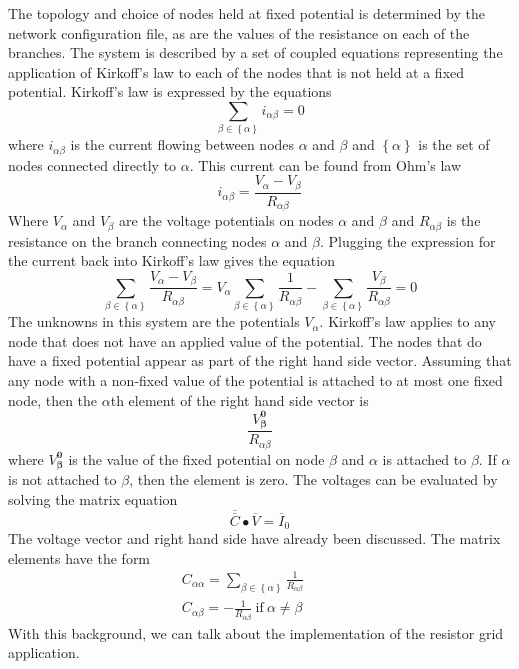 \documentclass[12pt]{report} %
\begin{document}

The topology and choice of nodes held at fixed potential is determined by the network configuration file, as are the values of the resistance on each of the branches. The system is described by a set of coupled equations representing the application of Kirkoff's law to each of the nodes that is not held at a fixed potential. Kirkoff's law is expressed by the equations\[\sum_{\beta \in \left\{\alpha \right\}}{i_{\alpha \beta }=0}\] 
where $i_{\alpha \beta }$ is the current flowing between nodes $\alpha $ and $\beta $ and $\left\{\alpha \right\}$ is the set of nodes connected directly to $\alpha $. This current can be found from Ohm's law
\[i_{\alpha \beta }=\frac{V_{\alpha }-V_{\beta }}{R_{\alpha \beta }}\] 
Where $V_{\alpha }$ and $V_{\beta }$ are the voltage potentials on nodes $\alpha $ and $\beta $ and $R_{\alpha \beta }$ is the resistance on the branch connecting nodes $\alpha $ and $\beta $. Plugging the expression for the current back into Kirkoff's law gives the equation
\[\sum_{\beta \in \left\{\alpha \right\}}{\frac{V_{\alpha }-V_{\beta }}{R_{\alpha \beta }}=V_{\alpha }\sum_{\beta \in \left\{\alpha \right\}}{\frac{1}{R_{\alpha \beta }}}-\sum_{\beta \in \left\{\alpha \right\}}{\frac{V_{\beta }}{R_{\alpha \beta }}}=0}\] 
The unknowns in this system are the potentials $V_{\alpha }$. Kirkoff's law applies to any node that does not have an applied value of the potential. The nodes that do have a fixed potential appear as part of the right hand side vector. Assuming that any node with a non-fixed value of the potential is attached to at most one fixed node, then the $\alpha $th element of the right hand side vector is
\[\frac{V^{\boldsymbol{0}}_{\boldsymbol{\beta }}}{R_{\alpha \beta }}\] 
where $V^{\boldsymbol{0}}_{\boldsymbol{\beta }}$ is the value of the fixed potential on node $\beta $ and $\alpha $ is attached to $\beta $. If $\alpha $ is not attached to $\beta $, then the element is zero. The voltages can be evaluated by solving the matrix equation
\[\overline{\overline{C}}\bullet \overline{V}={\overline{I}}_0\] 
The voltage vector and right hand side have already been discussed. The matrix elements have the form
\[ \begin{array}{c}
C_{\alpha \alpha }=\sum_{\beta \in \left\{\alpha \right\}}{\frac{1}{R_{\alpha \beta }}\ \ \ \ \ \ \ \ \ \ \ } \\ 
C_{\alpha \beta }=-\frac{1}{R_{\alpha \beta }}\ \mathrm{if}\ \alpha \neq \beta  \end{array}
\] 
With this background, we can talk about the implementation of the resistor grid application.
\end{document}
